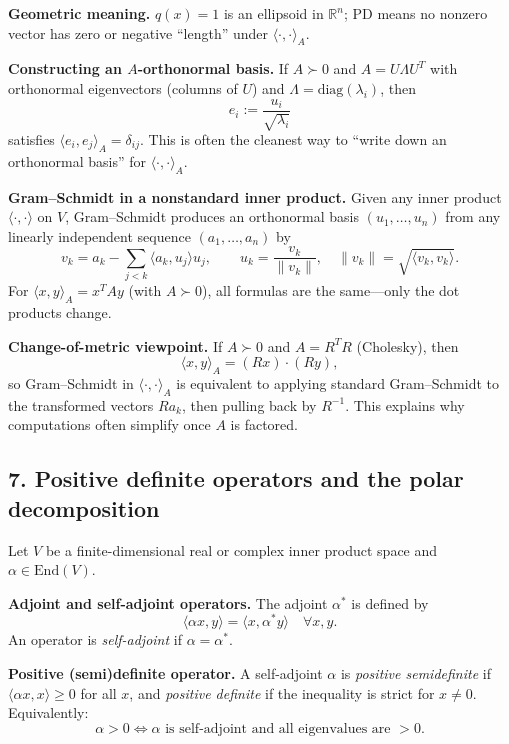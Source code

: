 \documentclass[12pt,a4paper]{article}
\theoremstyle{plain}
\theoremstyle{definition}      %
\begin{document}
\textbf{Geometric meaning.}
$q(x)=1$ is an ellipsoid in $\mathbb R^n$; PD means no nonzero vector has zero or negative ``length'' under $\langle\cdot,\cdot\rangle_A$.

\textbf{Constructing an $A$-orthonormal basis.}
If $A\succ0$ and $A=U\Lambda U^T$ with orthonormal eigenvectors (columns of $U$) and $\Lambda=\mathrm{diag}(\lambda_i)$, then
\[
e_i:=\frac{u_i}{\sqrt{\lambda_i}}
\]
satisfies $\langle e_i,e_j\rangle_A=\delta_{ij}$.
This is often the cleanest way to ``write down an orthonormal basis'' for $\langle\cdot,\cdot\rangle_A$.

\textbf{Gram--Schmidt in a nonstandard inner product.}
Given any inner product $\langle\cdot,\cdot\rangle$ on $V$, Gram--Schmidt produces an orthonormal basis $(u_1,\dots,u_n)$ from any linearly independent sequence $(a_1,\dots,a_n)$ by
\[
v_k=a_k-\sum_{j<k}\langle a_k,u_j\rangle u_j,\qquad u_k=\frac{v_k}{\|v_k\|},\quad \|v_k\|=\sqrt{\langle v_k,v_k\rangle}.
\]
For $\langle x,y\rangle_A=x^TAy$ (with $A\succ0$), all formulas are the same---only the dot products change.

\textbf{Change-of-metric viewpoint.}
If $A\succ0$ and $A=R^TR$ (Cholesky), then
\[
\langle x,y\rangle_A = (Rx)\cdot (Ry),
\]
so Gram--Schmidt in $\langle\cdot,\cdot\rangle_A$ is equivalent to applying standard Gram--Schmidt to the transformed vectors $Ra_k$,
then pulling back by $R^{-1}$.
This explains why computations often simplify once $A$ is factored.


\subsection*{7. Positive definite operators and the polar decomposition}

Let $V$ be a finite-dimensional real or complex inner product space and $\alpha\in \mathrm{End}(V)$.

\textbf{Adjoint and self-adjoint operators.}
The adjoint $\alpha^*$ is defined by
\[
\langle \alpha x,y\rangle=\langle x,\alpha^*y\rangle\quad \forall x,y.
\]
An operator is \emph{self-adjoint} if $\alpha=\alpha^*$.

\textbf{Positive (semi)definite operator.}
A self-adjoint $\alpha$ is \emph{positive semidefinite} if $\langle \alpha x,x\rangle\ge 0$ for all $x$, and \emph{positive definite} if the inequality is strict for $x\neq 0$.
Equivalently:
\[
\alpha>0 \iff \alpha \text{ is self-adjoint and all eigenvalues are } >0.
\]
\end{document}
